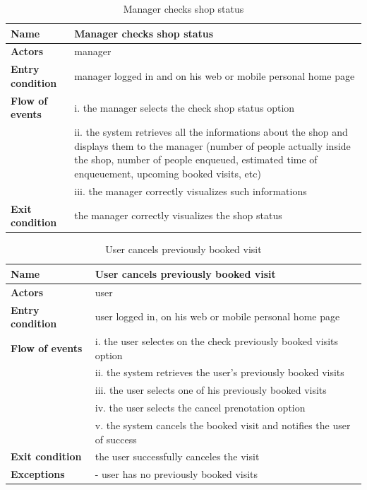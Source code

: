\begin{table}[h!]
    \centering
    \begin{tabular}{@{}P{0.2\textwidth}P{0.70\textwidth}@{}}
        \toprule
        \textbf{Name}                 & Manager checks shop status\\
        \midrule
        \textbf{Actors}               & manager\\
        \textbf{Entry condition}      & manager logged in and on his web or mobile personal home page\\
        \textbf{Flow of events}            
        & i. the manager selects the check shop status option\\
        & ii. the system retrieves all the informations about the shop and displays them to the manager (number of people actually inside the shop, number of people enqueued, estimated time of enqueuement, upcoming booked visits, etc)\\
        & iii. the manager correctly visualizes such informations\\
        \textbf{Exit condition}       & the manager correctly visualizes the shop status\\
        \bottomrule
    \end{tabular}
\caption{Manager checks shop status}
\label{table:managerchecksshopstatus}
\end{table}

\begin{table}[h!]
    \centering
    \begin{tabular}{@{}P{0.2\textwidth}P{0.70\textwidth}@{}}
        \toprule
        \textbf{Name}                 & User cancels previously booked visit\\
        \midrule
        \textbf{Actors}               & user\\
        \textbf{Entry condition}      & user logged in, on his web or mobile personal home page\\
        \textbf{Flow of events}            
        & i. the user selectes on the check previously booked visits option\\
        & ii. the system retrieves the user's previously booked visits\\
        & iii. the user selects one of his previously booked visits\\
        & iv. the user selects the cancel prenotation option\\
        & v. the system cancels the booked visit and notifies the user of success\\
        \textbf{Exit condition}       & the user successfully canceles the visit\\
        \textbf{Exceptions}           
        & - user has no previously booked visits\\
        \bottomrule
    \end{tabular}
\caption{User cancels previously booked visit}
\label{table:usercancelspreviouslybookedvisit}
\end{table}

